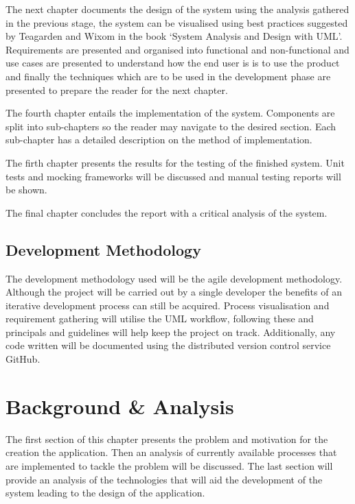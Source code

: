 \documentclass[a4paper, 11pt]{article}
\begin{document}
The next chapter documents the design of the system using the analysis gathered in the previous stage, the system can be visualised using best practices suggested by Teagarden and Wixom in the book `System Analysis and Design with UML'. Requirements are presented and organised into functional and non-functional and use cases are presented to understand how the end user is is to use the product and finally the techniques which are to be used in the development phase are presented to prepare the reader for the next chapter. 

The fourth chapter entails the implementation of the system. Components are split into sub-chapters so the reader may navigate to the desired section. Each sub-chapter has a detailed description on the method of implementation.

The firth chapter presents the results for the testing of the finished system. Unit tests and mocking frameworks will be discussed and manual testing reports will be shown.

The final chapter concludes the report with a critical analysis of the system. 

\subsection{Development Methodology}
The development methodology used will be the agile development methodology\cite{agile}. Although the project will be carried out by a single developer the benefits of an iterative development process can still be acquired. Process visualisation and requirement gathering will utilise the UML workflow, following these and principals and guidelines will help keep the project on track. Additionally, any code written will be documented using the distributed version control service GitHub. 
\clearpage

\section{Background \& Analysis}
The first section of this chapter presents the problem and motivation for the creation the application. Then an analysis of currently available processes that are implemented to tackle the problem will be discussed. The last section will provide an analysis of the technologies that will aid the development of the system leading to the design of the application. 
\end{document}
